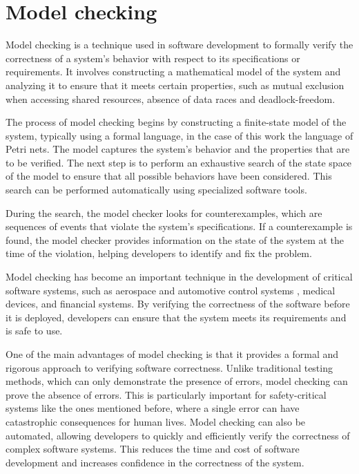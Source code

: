 \documentclass[../Thesis.tex]{subfiles}
\begin{document}
\section{Model checking}

Model checking is a technique used in software development
to formally verify the correctness of a system's behavior
with respect to its specifications or requirements.
It involves constructing a mathematical model of the system
and analyzing it to ensure that it meets certain properties,
such as mutual exclusion when accessing shared resources,
absence of data races and deadlock-freedom.

The process of model checking begins by constructing a finite-state model of the system,
typically using a formal language, in the case of this work the language of Petri nets.
The model captures the system's behavior and the properties that are to be verified.
The next step is to perform an exhaustive search of the state space of the model
to ensure that all possible behaviors have been considered.
This search can be performed automatically using specialized software tools.

During the search, the model checker looks for counterexamples,
which are sequences of events that violate the system's specifications.
If a counterexample is found, the model checker provides information
on the state of the system at the time of the violation,
helping developers to identify and fix the problem.

Model checking has become an important technique
in the development of critical software systems,
such as aerospace \cite{carreno2005safety,monzon2009deadlock}
and automotive control systems \cite{Perronnet2019},
medical devices, and financial systems.
By verifying the correctness of the software before it is deployed,
developers can ensure that the system meets its requirements and is safe to use.

One of the main advantages of model checking is
that it provides a formal and rigorous approach to verifying software correctness.
Unlike traditional testing methods, which can only demonstrate the presence of errors,
model checking can prove the absence of errors.
This is particularly important for safety-critical systems like the ones mentioned before,
where a single error can have catastrophic consequences for human lives.
Model checking can also be automated, allowing developers to quickly
and efficiently verify the correctness of complex software systems.
This reduces the time and cost of software development
and increases confidence in the correctness of the system.
\end{document}
